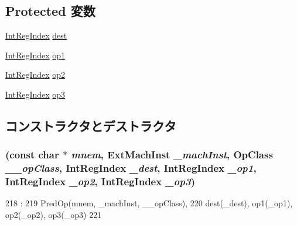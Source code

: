 \subsection*{Protected 変数}
\begin{DoxyCompactItemize}
\item 
\hyperlink{namespaceArmISA_ae64680ba9fb526106829d6bf92fc791b}{IntRegIndex} \hyperlink{classRegRegRegRegOp_aec72e8e45bdc87abeeeb75d2a8a9a716}{dest}
\item 
\hyperlink{namespaceArmISA_ae64680ba9fb526106829d6bf92fc791b}{IntRegIndex} \hyperlink{classRegRegRegRegOp_a4c465c43ad568f8bcf8ae71480e9cfea}{op1}
\item 
\hyperlink{namespaceArmISA_ae64680ba9fb526106829d6bf92fc791b}{IntRegIndex} \hyperlink{classRegRegRegRegOp_a7799ff6cbe5a252199059eb8665820e7}{op2}
\item 
\hyperlink{namespaceArmISA_ae64680ba9fb526106829d6bf92fc791b}{IntRegIndex} \hyperlink{classRegRegRegRegOp_aeebae963914149e59062881eccc25c48}{op3}
\end{DoxyCompactItemize}


\subsection{コンストラクタとデストラクタ}
\hypertarget{classRegRegRegRegOp_a8b9171f2421443ef19fc5d5f44914ff3}{
\subsubsection[{RegRegRegRegOp}]{ (const char $\ast$ {\em mnem}, \/  {\bf ExtMachInst} {\em \_\-machInst}, \/  OpClass {\em \_\-\_\-opClass}, \/  {\bf IntRegIndex} {\em \_\-dest}, \/  {\bf IntRegIndex} {\em \_\-op1}, \/  {\bf IntRegIndex} {\em \_\-op2}, \/  {\bf IntRegIndex} {\em \_\-op3})}}
\label{classRegRegRegRegOp_a8b9171f2421443ef19fc5d5f44914ff3}



\begin{DoxyCode}
218                                                        :
219         PredOp(mnem, _machInst, __opClass),
220         dest(_dest), op1(_op1), op2(_op2), op3(_op3)
221     {}

\end{DoxyCode}


